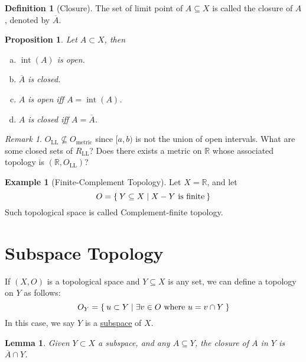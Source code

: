 \documentclass[12pt]{amsart}
\newcommand{\bbR}{\mathbb{R}}
\newcommand{\LL}{\operatorname{LL}}
\theoremstyle{plain}
\newtheorem*{prop}{Proposition}
\newtheorem*{lem}{Lemma}
\theoremstyle{remark}
\newtheorem*{rmk}{Remark}
\theoremstyle{definition}
\newtheorem*{define}{Definition}
\newtheorem*{eg}{Example}
\begin{document}
\begin{define}[Closure]
	The set of limit point of $A\subseteq X$ is called the closure of $A$, denoted by $\overline{A}$.
\end{define}

\begin{prop}
	Let $A \subset X$, then
	\begin{enumerate} [(a)]
		\item $\operatorname{int}(A)$ is open.
		\item $\overline{A}$ is closed.
		\item $A$ is open iff $A = \operatorname{int}(A)$.
		\item $A$ is closed iff $A = \overline{A}$.
	\end{enumerate}
\end{prop}

\begin{rmk}
	$O_{\LL} \not\subseteq O_{\text{metric}}$ since $[a, b)$ is not the union of open intervals.
	\newline
	What are some closed sets of $R_{\LL}$?
	\newline
	Does there exists a metric on $\bbR$ whose associated topology is $(\bbR, O_{\LL})$?  
\end{rmk} 

\begin{eg}[Finite-Complement Topology]

	Let $X = \bbR$, and let
	\begin{equation*}
		O = \Set{Y \subseteq X | X - Y \text{ is finite}}
	\end{equation*}
	Such topological space is called Complement-finite topology.
\end{eg}

\section*{Subspace Topology}
If $(X, O)$ is a topological space and $Y \subseteq X$ is any set, we can define a topology on $Y$ as follows:
\begin{equation*}
	O_Y = \Set{u\subset Y | \exists v \in O \text{ where } u = v \cap Y}
\end{equation*}
In this case, we say $Y$ is a \ul{subspace} of $X$.
\begin{lem}
	Given $Y \subset X$ a subspace, and any $A \subseteq Y$, the closure of $A$ in $Y$ is $\overline{A} \cap Y$.
\end{lem}
\end{document}
